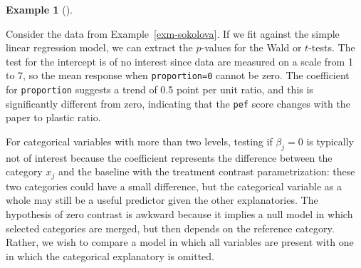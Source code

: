 \documentclass[
  11pt,
  letterpaper,
]{scrbook}
\newenvironment{Shaded}{\begin{snugshade}}{\end{snugshade}}
\newcommand{\CommentTok}[1]{\textcolor[rgb]{0.37,0.37,0.37}{#1}}
\newcommand{\FunctionTok}[1]{\textcolor[rgb]{0.28,0.35,0.67}{#1}}
\newcommand{\NormalTok}[1]{\textcolor[rgb]{0.00,0.23,0.31}{#1}}
\newcommand{\SpecialCharTok}[1]{\textcolor[rgb]{0.37,0.37,0.37}{#1}}
\theoremstyle{plain}
\theoremstyle{definition}
\newtheorem{example}{Example}[chapter]
\theoremstyle{definition}
\theoremstyle{plain}
\theoremstyle{remark}
\begin{document}
\begin{example}[]\protect\hypertarget{exm-sokolova-simple-ttest}{}\label{exm-sokolova-simple-ttest}

Consider the data from Example~\ref{exm-sokolova}. If we fit against the
simple linear regression model, we can extract the \(p\)-values for the
Wald or \(t\)-tests. The test for the intercept is of no interest since
data are measured on a scale from 1 to 7, so the mean response when
\texttt{proportion=0} cannot be zero. The coefficient for
\texttt{proportion} suggests a trend of 0.5 point per unit ratio, and
this is significantly different from zero, indicating that the
\texttt{pef} score changes with the paper to plastic ratio.

\begin{Shaded}
\end{Shaded}

\end{example}

For categorical variables with more than two levels, testing if
\(\beta_j=0\) is typically not of interest because the coefficient
represents the difference between the category \(x_j\) and the baseline
with the treatment contrast parametrization: these two categories could
have a small difference, but the categorical variable as a whole may
still be a useful predictor given the other explanatories. The
hypothesis of zero contrast is awkward because it implies a null model
in which selected categories are merged, but then depends on the
reference category. Rather, we wish to compare a model in which all
variables are present with one in which the categorical explanatory is
omitted.
\end{document}
